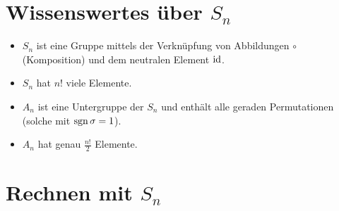 \documentclass{../../algblatt}
\begin{document}
\section{Wissenswertes über $S_n$}

\begin{itemize}
\item $S_n$ ist eine Gruppe mittels der Verknüpfung von Abbildungen $\circ$
(Komposition) und dem neutralen Element $\mathrm{id}$.
\item $S_n$ hat $n!$ viele Elemente.
\item $A_n$ ist eine Untergruppe der $S_n$ und enthält alle geraden
Permutationen (solche mit $\operatorname{sgn} \sigma = 1$).
\item $A_n$ hat genau $\frac{n!}{2}$ Elemente.
\end{itemize}


\section{Rechnen mit $S_n$}
\end{document}
